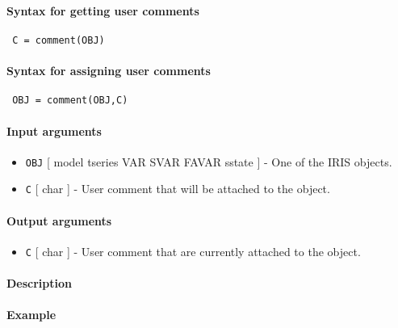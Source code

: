 


	\paragraph{Syntax for getting user comments}
 
 \begin{verbatim}
 C = comment(OBJ)
 \end{verbatim}
 
 \paragraph{Syntax for assigning user comments}
 
 \begin{verbatim}
 OBJ = comment(OBJ,C)
 \end{verbatim}
 
 \paragraph{Input arguments}
 
 \begin{itemize}
 \item
   \texttt{OBJ} {[} model \textbar{} tseries \textbar{} VAR \textbar{}
   SVAR \textbar{} FAVAR \textbar{} sstate {]} - One of the IRIS objects.
 \item
   \texttt{C} {[} char {]} - User comment that will be attached to the
   object.
 \end{itemize}
 
 \paragraph{Output arguments}
 
 \begin{itemize}
 \item
   \texttt{C} {[} char {]} - User comment that are currently attached to
   the object.
 \end{itemize}
 
 \paragraph{Description}
 
 \paragraph{Example}


